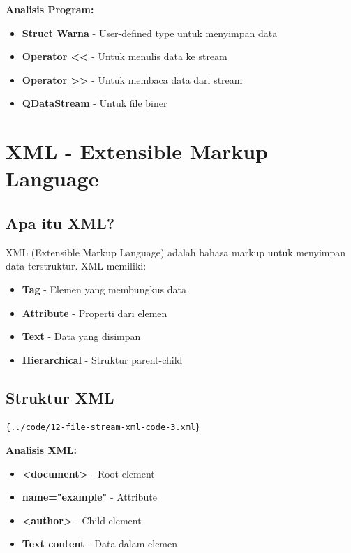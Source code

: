 \textbf{Analisis Program:}
\begin{itemize}
\item \textbf{Struct Warna} - User-defined type untuk menyimpan data
\item \textbf{Operator <<} - Untuk menulis data ke stream
\item \textbf{Operator >>} - Untuk membaca data dari stream
\item \textbf{QDataStream} - Untuk file biner
\end{itemize}

\section{XML - Extensible Markup Language}

\subsection{Apa itu XML?}

XML (Extensible Markup Language) adalah bahasa markup untuk menyimpan data terstruktur. XML memiliki:

\begin{itemize}
\item \textbf{Tag} - Elemen yang membungkus data
\item \textbf{Attribute} - Properti dari elemen
\item \textbf{Text} - Data yang disimpan
\item \textbf{Hierarchical} - Struktur parent-child
\end{itemize}

\subsection{Struktur XML}

\begin{lstlisting}[language=xml]{../code/12-file-stream-xml-code-3.xml}
\end{lstlisting}

\textbf{Analisis XML:}
\begin{itemize}
\item \textbf{<document>} - Root element
\item \textbf{name="example"} - Attribute
\item \textbf{<author>} - Child element
\item \textbf{Text content} - Data dalam elemen
\end{itemize}

